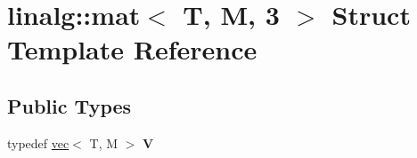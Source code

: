 \hypertarget{structlinalg_1_1mat_3_01T_00_01M_00_013_01_4}{}\section{linalg\+:\+:mat$<$ T, M, 3 $>$ Struct Template Reference}
\label{structlinalg_1_1mat_3_01T_00_01M_00_013_01_4}
\subsection*{Public Types}
\begin{DoxyCompactItemize}
\item 
typedef \hyperlink{structlinalg_1_1vec}{vec}$<$ T, M $>$ {\bfseries V}\hypertarget{structlinalg_1_1mat_3_01T_00_01M_00_013_01_4_a704a3d0f2048bec22ca8a4e286e10df6}{}\label{structlinalg_1_1mat_3_01T_00_01M_00_013_01_4_a704a3d0f2048bec22ca8a4e286e10df6}

\end{DoxyCompactItemize}
